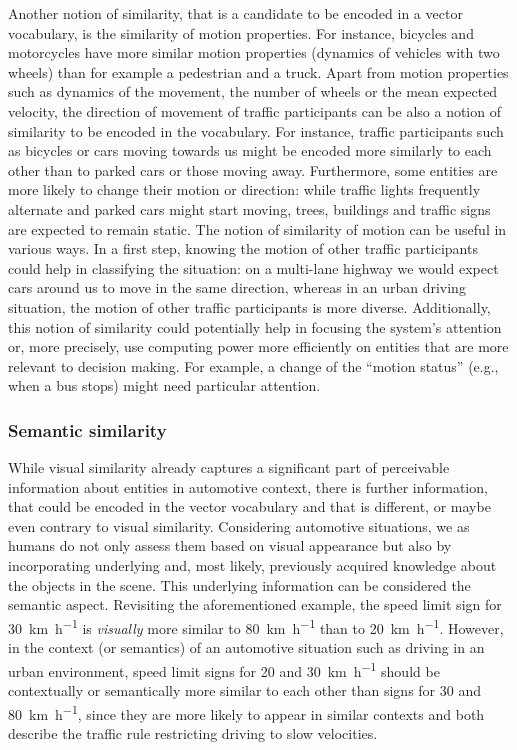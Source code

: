 Another notion of similarity, that is a candidate to be encoded in a vector vocabulary, is the similarity of motion properties.
For instance, bicycles and motorcycles have more similar motion properties (dynamics of vehicles with two wheels) than for example a pedestrian and a truck.
Apart from motion properties such as dynamics of the movement, the number of wheels or the mean expected velocity, the direction of movement of traffic participants can be also a notion of similarity to be encoded in the vocabulary.
For instance, traffic participants such as bicycles or cars moving towards us might be encoded more similarly to each other than to parked cars or those moving away.
Furthermore, some entities are more likely to change their motion or direction: while traffic lights frequently alternate and parked cars might start moving, trees, buildings and traffic signs are expected to remain static. 
The notion of similarity of motion can be useful in various ways.
In a first step, knowing the motion of other traffic participants could help in classifying the situation: on a multi-lane highway we would expect cars around us to move in the same direction, whereas in an urban driving situation, the motion of other traffic participants is more diverse. 
Additionally, this notion of similarity could potentially help in focusing the system's attention or, more precisely, use computing power more efficiently on entities that are more relevant to decision making.
For example, a change of the \enquote{motion status} (e.g., when a bus stops) might need particular attention.

\subsubsection{Semantic similarity}%
\label{ssubsec:semantic_similarity}

While visual similarity already captures a significant part of perceivable information about entities in automotive context, there is further information, that could be encoded in the vector vocabulary and that is different, or maybe even contrary to visual similarity. 
Considering automotive situations, we as humans do not only assess them based on visual appearance but also by incorporating underlying and, most likely, previously acquired knowledge about the objects in the scene.
This underlying information can be considered the semantic aspect.
Revisiting the aforementioned example, the speed limit sign for \SI[per-mode=symbol]{30}{\kilo\meter\per\hour} is \emph{visually} more similar to \SI[per-mode=symbol]{80}{\kilo\meter\per\hour} than to \SI[per-mode=symbol]{20}{\kilo\meter\per\hour}.
However, in the context (or semantics) of an automotive situation such as driving in an urban environment, speed limit signs for \num{20} and \SI[per-mode=symbol]{30}{\kilo\meter\per\hour} should be contextually or semantically more similar to each other than signs for \num{30} and \SI[per-mode=symbol]{80}{\kilo\meter\per\hour}, since they are more likely to appear in similar contexts and both describe the traffic rule restricting driving to slow velocities.

